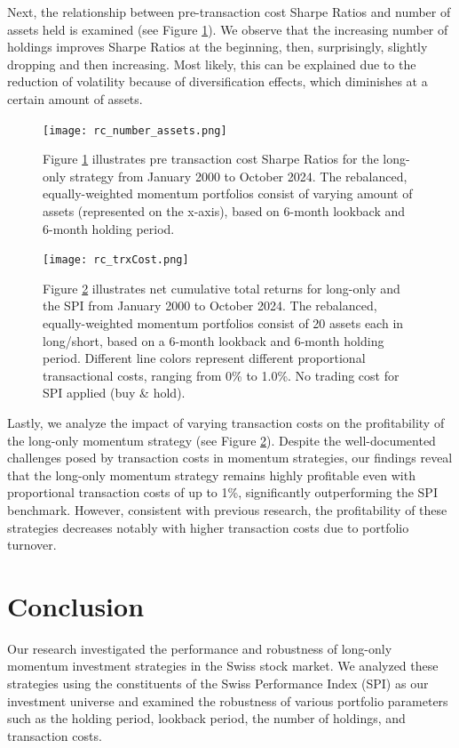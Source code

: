 \documentclass[a4paper,12pt]{article}
\begin{document}
    Next, the relationship between pre-transaction cost Sharpe Ratios and number of assets held is examined (see Figure \ref{fig_04}). We observe that the increasing number of holdings improves Sharpe Ratios at the beginning, then, surprisingly, slightly dropping and then increasing. Most likely, this can be explained due to the reduction of volatility because of diversification effects, which diminishes at a certain amount of assets. 
    \begin{figure}[htbp]
    \centerline{\texttt{[image: rc\_number\_assets.png]}}
    \caption{}
    \label{fig_04}
    \small{{Figure \ref{fig_04} illustrates pre transaction cost Sharpe Ratios for the long-only strategy from January 2000 to October 2024. The rebalanced, equally-weighted momentum portfolios consist of varying amount of assets (represented on the x-axis), based on 6-month lookback and 6-month holding period.}}
    \end{figure}
    
    
    \begin{figure}[htbp]
    \centerline{\texttt{[image: rc\_trxCost.png]}}
    \caption{}
    \label{fig_05}
    \small{{Figure \ref{fig_05} illustrates net cumulative total returns for long-only and the SPI from January 2000 to October 2024. The rebalanced, equally-weighted momentum portfolios consist of 20 assets each in long/short, based on a 6-month lookback and 6-month holding period. Different line colors represent different proportional transactional costs, ranging from 0\% to 1.0\%. No trading cost for SPI applied (buy \& hold).}}
    \end{figure}
    
    Lastly, we analyze the impact of varying transaction costs on the profitability of the long-only momentum strategy (see Figure \ref{fig_05}). Despite the well-documented challenges posed by transaction costs in momentum strategies, our findings reveal that the long-only momentum strategy remains highly profitable even with proportional transaction costs of up to 1\%, significantly outperforming the SPI benchmark. However, consistent with previous research, the profitability of these strategies decreases notably with higher transaction costs due to portfolio turnover. 
    \newpage
    
    \section{Conclusion}
    Our research investigated the performance and robustness of long-only momentum investment strategies in the Swiss stock market. We analyzed these strategies using the constituents of the Swiss Performance Index (SPI) as our investment universe and examined the robustness of various portfolio parameters such as the holding period, lookback period, the number of holdings, and transaction costs.
    
\end{document}
